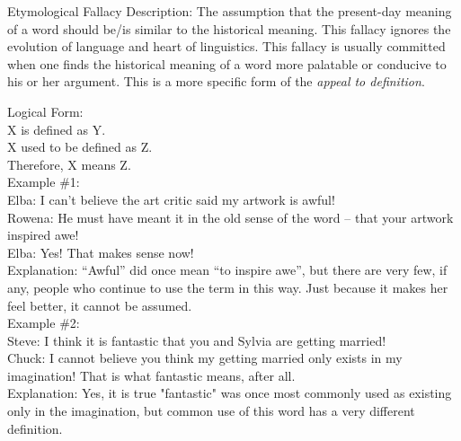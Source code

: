 \documentclass[a4paper,12pt,single,pdftex]{scrartcl}
\begin{document}
Etymological Fallacy
    Description: The assumption that the present-day meaning of a word should be/is similar to the historical meaning.  This fallacy ignores the evolution of language and heart of linguistics.  This fallacy is usually committed when one finds the historical meaning of a word more palatable or conducive to his or her argument. This is a more specific form of the {\it appeal to definition}.

    
      Logical Form:
    \\

    
      X is defined as Y.
    \\

    
      X used to be defined as Z.
    \\

    
      Therefore, X means Z.
    \\

    
      Example \#1:
    \\

    
      Elba: I can’t believe the art critic said my artwork is awful!
    \\

    
      Rowena: He must have meant it in the old sense of the word -- that your artwork inspired awe!
    \\

    
      Elba: Yes!  That makes sense now!
    \\

    
      Explanation: “Awful” did once mean “to inspire awe”, but there are very few, if any, people who continue to use the term in this way.  Just because it makes her feel better, it cannot be assumed.
    \\

    
      Example \#2:
    \\

    
      Steve: I think it is fantastic that you and Sylvia are getting married!
    \\

    
      Chuck: I cannot believe you think my getting married only exists in my imagination!  That is what fantastic means, after all.
    \\

    
      Explanation: Yes, it is true "fantastic" was once most commonly used as existing only in the imagination, but common use of this word has a very different definition.
    \\
\end{document}
